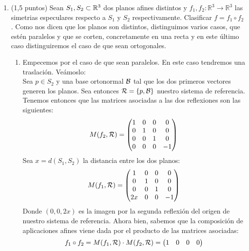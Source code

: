 \documentclass[12pt]{article}
\begin{document}
\begin{ejercicio}[3 puntos]
\begin{enumerate}
        \item (1,5 puntos) Sean \( S_1, S_2 \subset \mathbb{R}^3 \) dos planos afines distintos y \( f_1, f_2 : \mathbb{R}^3 \to \mathbb{R}^3 \) las simetrias especulares respecto a \( S_1 \) y \( S_2 \) respectivamente. Clasificar \( f = f_1 \circ f_2 \).
        Como nos dicen que los planos son distintos, distinguimos varios casos, que estén paralelos y que se corten, concretamente en una recta y en este último caso distinguiremos el caso de que sean ortogonales.
        \begin{enumerate}
            \item Empecemos por el caso de que sean paralelos. En este caso tendremos una traslación. Veámoslo: \\
                Sea $p\in S_2$ y una base ortonormal $\cc{B}$ tal que los dos primeros vectores generen los planos. Sea entonces $\cc{R} = \{p,\cc{B}\}$ nuestro sistema de referencia. Tenemos entonces que las matrices asociadas a las dos reflexiones son las siguientes:
                $$ M(f_2,\cc{R})=
                \begin{pmatrix}
                    1 & 0 & 0 & 0 \\
                    0 & 1 & 0 & 0 \\
                    0 & 0 & 1 & 0 \\
                    0 & 0 & 0 & -1 \\
                \end{pmatrix}$$    
                Sea $x = d(S_1,S_2)$ la distancia entre los dos planos:
                $$ M(f_1,\cc{R})=
                \begin{pmatrix}
                    1 & 0 & 0 & 0 \\
                    0 & 1 & 0 & 0 \\
                    0 & 0 & 1 & 0 \\
                    2x & 0 & 0 & -1 \\
                \end{pmatrix} $$   
                Donde $(0,0,2x)$ es la imagen por la segunda reflexión del origen de nuestro sistema de referencia. Ahora bien, sabemos que la composición de aplicaciones afines viene dada por el producto de las matrices asociadas:
                $$f_1\circ f_2=M(f_1,\cc{R})\cdot M(f_2,\cc{R}) = 
                \begin{pmatrix}
                    1 & 0 & 0 & 0 \\

\end{pmatrix}$$
\end{enumerate}
\end{enumerate}
\end{ejercicio}
\end{document}
